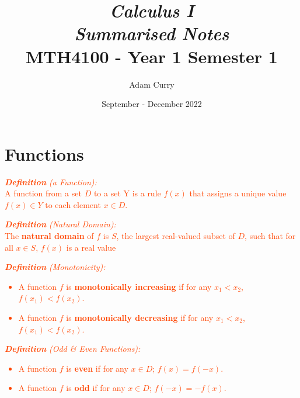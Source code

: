 \documentclass{report}
\title{\huge{\textbf{\textit{Calculus I}}}\\
\Large\textbf{\textit{Summarised Notes}}\\
MTH4100 - Year 1 Semester 1}
\author{Adam Curry}
\date{September - December 2022}
\newenvironment{definition}[1][OrangeRed]
  {\begin{tcolorbox}[colframe=#1,colback=white]}
  {\end{tcolorbox}}
\begin{document}
\maketitle
\tableofcontents
\chapter{Functions}

\begin{definition}
    \textcolor{OrangeRed}{\textit{\textbf{Definition} (a Function):}\\
    A function from a set $D$ to a set Y is a rule $f(x)$ that assigns a unique value $f(x) \in Y$ to each element $x \in D$.}
\end{definition}

\begin{definition}
    \textcolor{OrangeRed}{\textit{\textbf{Definition} (Natural Domain):}\\
   The \textbf{natural domain} of $f$ is $S$, the largest real-valued subset of $D$, such that for all $x \in S$, $f(x)$ is a real value}
\end{definition}

\begin{definition}
    \textcolor{OrangeRed}{\textit{\textbf{Definition} (Monotonicity):}
   \begin{itemize}
       \item A function $f$ is \textbf{monotonically increasing} if for any $x_1 < x_2$, $f(x_1) < f(x_2)$.
       \item A function $f$ is \textbf{monotonically decreasing} if for any $x_1 < x_2$, $f(x_1) < f(x_2)$.
   \end{itemize}}
\end{definition}

\begin{definition}
    \textcolor{OrangeRed}{\textit{\textbf{Definition} (Odd \& Even Functions):}
   \begin{itemize}
       \item A function $f$ is \textbf{even} if for any $x \in D$; $f(x) = f(-x)$.
       \item A function $f$ is \textbf{odd} if for any $x \in D$; $f(-x) = -f(x)$.
   \end{itemize}}
\end{definition}
\end{document}
